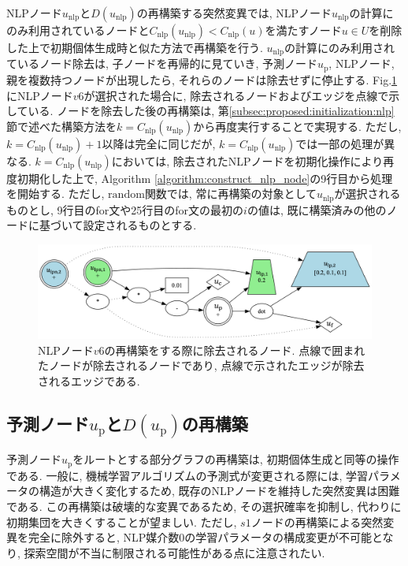 \documentclass[11pt,oneside,openany,report]{jsbook}
\begin{document}
NLPノード$u_\mathrm{nlp}$と$D(u_\mathrm{nlp})$の再構築する突然変異では, NLPノード$u_\mathrm{nlp}$の計算にのみ利用されているノードと$C_\mathrm{nlp}(u_\mathrm{nlp}) < C_\mathrm{nlp}(u)$を満たすノード$u \in U$を削除した上で初期個体生成時と似た方法で再構築を行う. $u_\mathrm{nlp}$の計算にのみ利用されているノード除去は, 子ノードを再帰的に見ていき, 予測ノード$u_\mathrm{p}$, NLPノード, 親を複数持つノードが出現したら, それらのノードは除去せずに停止する. Fig.\ref{fig:mgg_automl_zero_vag:mutation:reconstruct_nlp}にNLPノード$v6$が選択された場合に, 除去されるノードおよびエッジを点線で示している. ノードを除去した後の再構築は, 第\ref{subsec:proposed:initialization:nlp}節で述べた構築方法を$k=C_\mathrm{nlp}(u_\mathrm{nlp})$から再度実行することで実現する. ただし, $k=C_\mathrm{nlp}(u_\mathrm{nlp}) + 1$以降は完全に同じだが, $k=C_\mathrm{nlp}(u_\mathrm{nlp})$では一部の処理が異なる. $k=C_\mathrm{nlp}(u_\mathrm{nlp})$においては, 除去されたNLPノードを初期化操作により再度初期化した上で, Algorithm \ref{algorithm:construct_nlp_node}の9行目から処理を開始する. ただし, $\mathrm{random}$関数では, 常に再構築の対象として$u_\mathrm{nlp}$が選択されるものとし, 9行目のfor文や25行目のfor文の最初の$i$の値は, 既に構築済みの他のノードに基づいて設定されるものとする.

\begin{figure}
  \centering
  \includegraphics[width=14cm]{mgg_automl_zero_vag/mutations/reconstruct_nlp.png}
  \caption{NLPノード$v6$の再構築をする際に除去されるノード. 点線で囲まれたノードが除去されるノードであり, 点線で示されたエッジが除去されるエッジである. }
  \label{fig:mgg_automl_zero_vag:mutation:reconstruct_nlp}
\end{figure}

\subsection{予測ノード$u_\mathrm{p}$と$D(u_\mathrm{p})$の再構築}
予測ノード$u_\mathrm{p}$をルートとする部分グラフの再構築は, 初期個体生成と同等の操作である. 一般に, 機械学習アルゴリズムの予測式が変更される際には, 学習パラメータの構造が大きく変化するため, 既存のNLPノードを維持した突然変異は困難である. この再構築は破壊的な変異であるため, その選択確率を抑制し, 代わりに初期集団を大きくすることが望ましい. ただし, $s1$ノードの再構築による突然変異を完全に除外すると, NLP媒介数0の学習パラメータの構成変更が不可能となり, 探索空間が不当に制限される可能性がある点に注意されたい.
\end{document}
